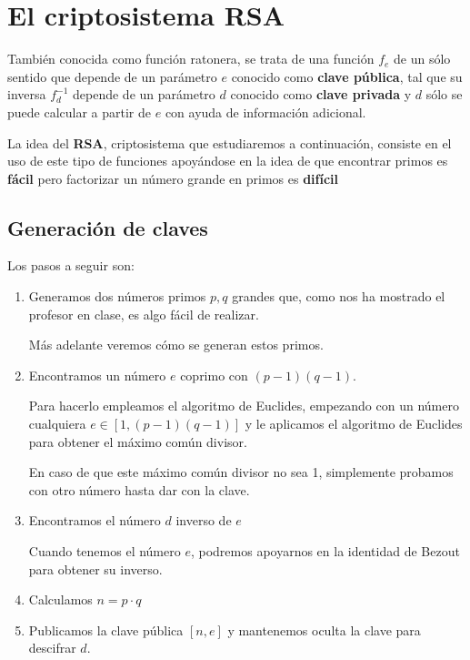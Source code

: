 \chapter{El criptosistema RSA}

\begin{defn}
También conocida como función ratonera, se trata de una función $f_e$ de un sólo sentido que depende de un parámetro $e$ conocido como \textbf{clave pública}, tal que su inversa $f^{-1}_d$ depende de un parámetro $d$ conocido como \textbf{clave privada} y $d$ sólo se puede calcular a partir de $e$ con ayuda de información adicional.
\end{defn}

La idea del \textbf{RSA}, criptosistema que estudiaremos a continuación, consiste en el uso de este tipo de funciones apoyándose en la idea de que encontrar primos es \textbf{fácil} pero factorizar un número grande en primos es \textbf{difícil}

\section{Generación de claves}
Los pasos a seguir son:
\begin{enumerate}
\item Generamos dos números primos $p,q$ grandes que, como nos ha mostrado el profesor en clase, es algo fácil de realizar.

Más adelante veremos cómo se generan estos primos.

\item Encontramos un número $e$ coprimo con $(p-1)(q-1)$.

Para hacerlo empleamos el algoritmo de Euclides, empezando con un número cualquiera $e\in [1, (p-1)(q-1)]$ y le aplicamos el algoritmo de Euclides para obtener el máximo común divisor.

En caso de que este máximo común divisor no sea 1, simplemente probamos con otro número hasta dar con la clave.

\item Encontramos el número $d$ inverso de $e$

Cuando tenemos el número $e$, podremos apoyarnos en la identidad de Bezout para obtener su inverso.

\item Calculamos $n=p\cdot q$

\item Publicamos la clave pública $[n,e]$ y mantenemos oculta la clave para descifrar $d$.
\end{enumerate}

